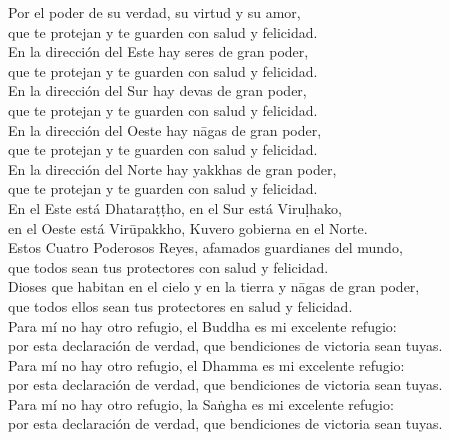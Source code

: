 \begin{onechants}
Por el poder de su verdad, su virtud y su amor,\\
 que te protejan y te guarden con salud y felicidad.\\
En la dirección del Este hay seres de gran poder,\\
 que te protejan y te guarden con salud y felicidad.\\
En la dirección del Sur hay devas de gran poder, \\
 que te protejan y te guarden con salud y felicidad.\\
En la dirección del Oeste hay nāgas de gran     poder,\\
que te protejan y te guarden con salud y felicidad.\\
En la dirección del Norte hay yakkhas de gran poder,\\
 que te protejan y te guarden con salud y felicidad.\\
En el Este está Dhataraṭṭho, en el Sur está Viruḷhako,\\
en el Oeste está Virūpakkho, Kuvero gobierna en el Norte.\\
Estos Cuatro Poderosos Reyes, afamados guardianes del mundo,\\
 que todos sean tus protectores con salud y felicidad.\\
Dioses que habitan en el cielo y en la tierra y nāgas de gran poder,\\
que todos ellos sean tus protectores en salud y felicidad.\\
Para mí no hay otro refugio, el Buddha es mi excelente refugio:\\
por esta declaración de verdad, que bendiciones de victoria sean tuyas.\\
Para mí no hay otro refugio, el Dhamma es mi excelente refugio:\\
por esta declaración de verdad, que bendiciones de victoria sean tuyas.\\
Para mí no hay otro refugio, la Saṅgha es mi excelente refugio:\\
por esta declaración de verdad, que bendiciones de victoria sean tuyas.\\

\end{onechants}

\clearpage

\paliText
\enlargethispage{2\baselineskip}
\savenotes

